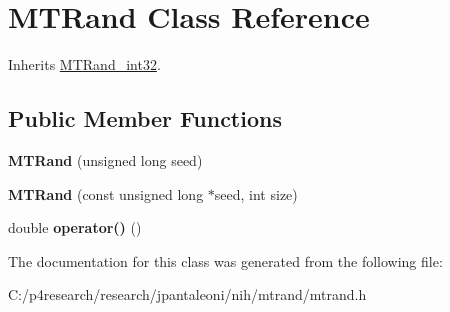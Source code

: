 \hypertarget{class_m_t_rand}{
\section{\-M\-T\-Rand \-Class \-Reference}
\label{class_m_t_rand}
}


\-Inherits \hyperlink{class_m_t_rand__int32}{\-M\-T\-Rand\-\_\-int32}.

\subsection*{\-Public \-Member \-Functions}
\begin{DoxyCompactItemize}
\item 
\hypertarget{class_m_t_rand_a2c88736896bcbdb54bcdd7a0026720d5}{
{\bfseries \-M\-T\-Rand} (unsigned long seed)}
\label{class_m_t_rand_a2c88736896bcbdb54bcdd7a0026720d5}

\item 
\hypertarget{class_m_t_rand_a6075a3beacdfb8e4cf48d9fb56cc193a}{
{\bfseries \-M\-T\-Rand} (const unsigned long $\ast$seed, int size)}
\label{class_m_t_rand_a6075a3beacdfb8e4cf48d9fb56cc193a}

\item 
\hypertarget{class_m_t_rand_abbb87a08d622d58fdee0eea4cb5471a0}{
double {\bfseries operator()} ()}
\label{class_m_t_rand_abbb87a08d622d58fdee0eea4cb5471a0}

\end{DoxyCompactItemize}


\-The documentation for this class was generated from the following file\-:\begin{DoxyCompactItemize}
\item 
\-C\-:/p4research/research/jpantaleoni/nih/mtrand/mtrand.\-h\end{DoxyCompactItemize}
